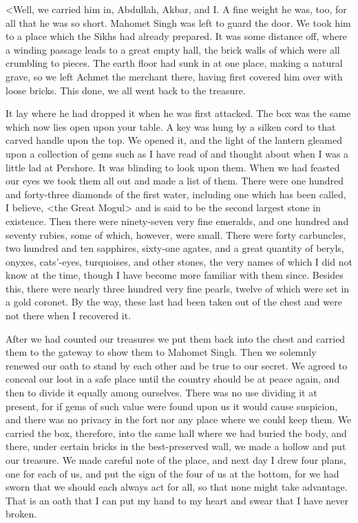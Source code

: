 <Well, we carried him in, Abdullah, Akbar, and I\@. A fine weight he was, too, for all that he was so short. Mahomet Singh was left to guard the door. We took him to a place which the Sikhs had already prepared. It was some distance off, where a winding passage leads to a great empty hall, the brick walls of which were all crumbling to pieces. The earth floor had sunk in at one place, making a natural grave, so we left Achmet the merchant there, having first covered him over with loose bricks. This done, we all went back to the treasure.

It lay where he had dropped it when he was first attacked. The box was the same which now lies open upon your table. A key was hung by a silken cord to that carved handle upon the top. We opened it, and the light of the lantern gleamed upon a collection of gems such as I have read of and thought about when I was a little lad at Pershore. It was blinding to look upon them. When we had feasted our eyes we took them all out and made a list of them. There were one hundred and forty-three diamonds of the first water, including one which has been called, I believe, <the Great Mogul> and is said to be the second largest stone in existence. Then there were ninety-seven very fine emeralds, and one hundred and seventy rubies, some of which, however, were small. There were forty carbuncles, two hundred and ten sapphires, sixty-one agates, and a great quantity of beryls, onyxes, cats'-eyes, turquoises, and other stones, the very names of which I did not know at the time, though I have become more familiar with them since. Besides this, there were nearly three hundred very fine pearls, twelve of which were set in a gold coronet. By the way, these last had been taken out of the chest and were not there when I recovered it.

After we had counted our treasures we put them back into the chest and carried them to the gateway to show them to Mahomet Singh. Then we solemnly renewed our oath to stand by each other and be true to our secret. We agreed to conceal our loot in a safe place until the country should be at peace again, and then to divide it equally among ourselves. There was no use dividing it at present, for if gems of such value were found upon us it would cause suspicion, and there was no privacy in the fort nor any place where we could keep them. We carried the box, therefore, into the same hall where we had buried the body, and there, under certain bricks in the best-preserved wall, we made a hollow and put our treasure. We made careful note of the place, and next day I drew four plans, one for each of us, and put the sign of the four of us at the bottom, for we had sworn that we should each always act for all, so that none might take advantage. That is an oath that I can put my hand to my heart and swear that I have never broken.

